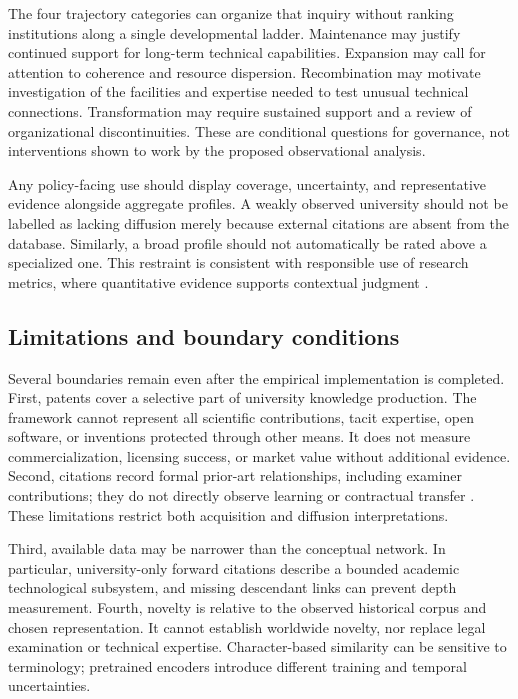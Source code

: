 The four trajectory categories can organize that inquiry without ranking
institutions along a single developmental ladder. Maintenance may justify
continued support for long-term technical capabilities. Expansion may call for
attention to coherence and resource dispersion. Recombination may motivate
investigation of the facilities and expertise needed to test unusual technical
connections. Transformation may require sustained support and a review of
organizational discontinuities. These are conditional questions for governance,
not interventions shown to work by the proposed observational analysis.

Any policy-facing use should display coverage, uncertainty, and representative
evidence alongside aggregate profiles. A weakly observed university should not
be labelled as lacking diffusion merely because external citations are absent
from the database. Similarly, a broad profile should not automatically be rated
above a specialized one. This restraint is consistent with responsible use of
research metrics, where quantitative evidence supports contextual judgment
\citep{hicks2015}.

\subsection{Limitations and boundary conditions}
Several boundaries remain even after the empirical implementation is completed.
First, patents cover a selective part of university knowledge production. The
framework cannot represent all scientific contributions, tacit expertise, open
software, or inventions protected through other means. It does not measure
commercialization, licensing success, or market value without additional evidence.
Second, citations record formal prior-art relationships, including examiner
contributions; they do not directly observe learning or contractual transfer
\citep{alcacer2006}. These limitations restrict both acquisition and diffusion
interpretations.

Third, available data may be narrower than the conceptual network. In particular,
university-only forward citations describe a bounded academic technological
subsystem, and missing descendant links can prevent depth measurement. Fourth,
novelty is relative to the observed historical corpus and chosen representation.
It cannot establish worldwide novelty, nor replace legal examination or technical
expertise. Character-based similarity can be sensitive to terminology; pretrained
encoders introduce different training and temporal uncertainties.

